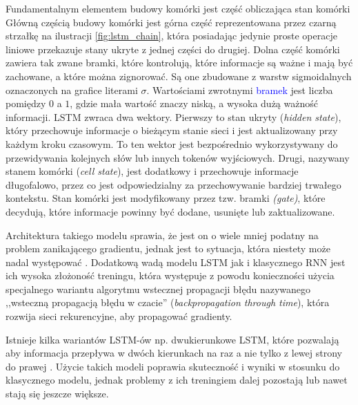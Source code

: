 \documentclass[data-science]{agh-wi} %
\begin{document}
Fundamentalnym elementem budowy komórki jest część obliczająca stan komórki 
Główną częścią budowy komórki jest górna część reprezentowana przez czarną strzałkę na ilustracji \ref*{fig:lstm_chain}, która posiadając jedynie proste operacje liniowe przekazuje stany ukryte z jednej części do drugiej. Dolna część komórki zawiera tak zwane bramki, które kontrolują, które informacje są ważne i mają być zachowane, a które można zignorować. Są one zbudowane z warstw sigmoidalnych oznaczonych na grafice literami $\sigma$. Wartościami zwrotnymi \textcolor{blue}{bramek} jest liczba pomiędzy $0$ a $1$, gdzie mała wartość znaczy niską, a wysoka dużą ważność informacji. LSTM zwraca dwa wektory. Pierwszy to stan ukryty (\textit{hidden state}), który przechowuje informacje o bieżącym stanie sieci i jest aktualizowany przy każdym kroku czasowym. To ten wektor jest bezpośrednio wykorzystywany do przewidywania kolejnych słów lub innych tokenów wyjściowych. Drugi, nazywany stanem komórki (\textit{cell state}), jest dodatkowy i przechowuje informacje długofalowo, przez co jest odpowiedzialny za przechowywanie bardziej trwałego kontekstu. Stan komórki jest modyfikowany przez tzw. bramki \textit{(gate)}, które decydują, które informacje powinny być dodane, usunięte lub zaktualizowane.

Architektura takiego modelu sprawia, że jest on o wiele mniej podatny na problem zanikającego gradientu, jednak jest to sytuacja, która niestety może nadal występować \cite{vanishing_gradient}. Dodatkową wadą modelu LSTM jak i klasycznego RNN jest ich wysoka złożoność treningu, która występuje z powodu konieczności użycia specjalnego wariantu algorytmu wstecznej propagacji błędu nazywanego ,,wsteczną propagacją błędu w czacie'' (\textit{backpropagation through time}), która rozwija sieci rekurencyjne, aby propagować gradienty.

Istnieje kilka wariantów LSTM-ów np. dwukierunkowe LSTM, które pozwalają aby informacja przepływa w dwóch kierunkach na raz a nie tylko z lewej strony do prawej \cite{bi_lstm}. Użycie takich modeli poprawia skuteczność i wyniki w stosunku do klasycznego modelu, jednak problemy z ich treningiem dalej pozostają lub nawet stają się jeszcze większe.
\end{document}
